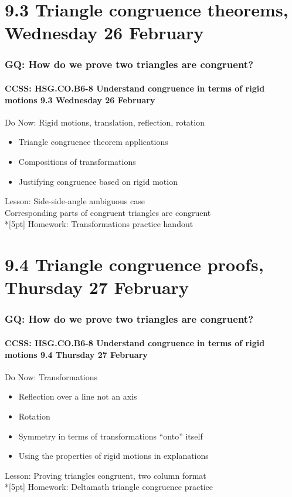 \documentclass{beamer}
\begin{document}
\section{9.3 Triangle congruence theorems, Wednesday 26 February} 
\frame
{
  \frametitle{GQ: How do we prove two triangles are congruent?}
  \framesubtitle{CCSS: HSG.CO.B6-8 Understand congruence in terms of rigid motions \hfill \alert{9.3 Wednesday 26 February}}

  \begin{block}{Do Now: Rigid motions, translation, reflection, rotation}
    \begin{itemize}
      \item Triangle congruence theorem applications
      \item Compositions of transformations
      \item Justifying congruence based on rigid motion
    \end{itemize}
    \end{block}
    Lesson: Side-side-angle ambiguous case \\
    Corresponding parts of congruent triangles are congruent\\*[5pt]
    Homework: Transformations practice handout
}

\section{9.4 Triangle congruence proofs, Thursday 27 February}
\frame
{
  \frametitle{GQ: How do we prove two triangles are congruent?}
  \framesubtitle{CCSS: HSG.CO.B6-8 Understand congruence in terms of rigid motions \hfill \alert{9.4 Thursday 27 February}}

  \begin{block}{Do Now: Transformations}
    \begin{itemize}
      \item Reflection over a line not an axis
      \item Rotation
      \item Symmetry in terms of transformations ``onto'' itself
      \item Using the properties of rigid motions in explanations
    \end{itemize}
    \end{block}
    Lesson: Proving triangles congruent, two column format \\*[5pt]
    Homework: Deltamath triangle congruence practice
}
\end{document}

